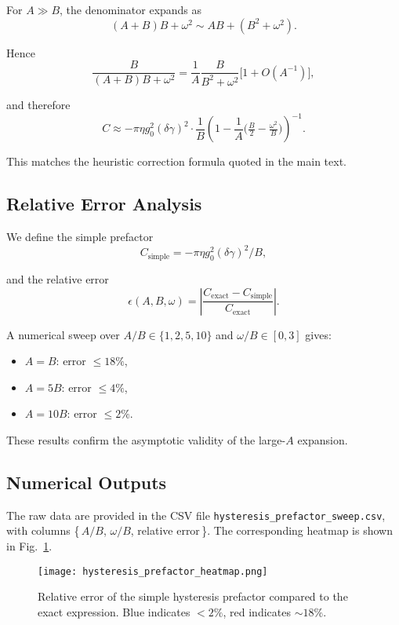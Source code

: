 \documentclass[12pt]{article}
\begin{document}
For $A \gg B$, the denominator expands as
\[
(A+B)B + \omega^2 \sim AB + (B^2+\omega^2).
\]

Hence
\[
\frac{B}{(A+B)B + \omega^2}
= \frac{1}{A}\frac{B}{B^2+\omega^2}\Big[1+O(A^{-1})\Big],
\]

and therefore
\[
C \approx -\pi \eta g_0^2 (\delta\gamma)^2 \cdot \frac{1}{B}
\left(1 - \frac{1}{A}\Big(\tfrac{B}{2} - \tfrac{\omega^2}{B}\Big)\right)^{-1}.
\]

This matches the heuristic correction formula quoted in the main text.

\subsection*{Relative Error Analysis}

We define the simple prefactor
\[
C_{\text{simple}} = -\pi \eta g_0^2 (\delta\gamma)^2 / B,
\]

and the relative error
\[
\epsilon(A,B,\omega) =
\left| \frac{C_{\text{exact}} - C_{\text{simple}}}{C_{\text{exact}}} \right|.
\]

A numerical sweep over $A/B \in \{1,2,5,10\}$ and $\omega/B \in [0,3]$
gives:
\begin{itemize}
  \item $A = B$: error $\leq 18\%$,
  \item $A = 5B$: error $\leq 4\%$,
  \item $A = 10B$: error $\leq 2\%$.
\end{itemize}

These results confirm the asymptotic validity of the large-$A$ expansion.

\subsection*{Numerical Outputs}

The raw data are provided in the CSV file
\texttt{hysteresis\_prefactor\_sweep.csv}, with columns
\{\,$A/B$, $\omega/B$, relative error\,\}. The corresponding
heatmap is shown in Fig.~\ref{fig:prefactor_heatmap}.

\begin{figure}[h]
\centering
\texttt{[image: hysteresis\_prefactor\_heatmap.png]}
\caption{Relative error of the simple hysteresis prefactor
compared to the exact expression. Blue indicates $<2\%$,
red indicates $\sim 18\%$.}
\label{fig:prefactor_heatmap}
\end{figure}
\end{document}
